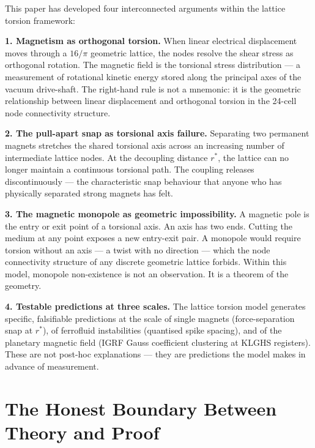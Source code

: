\documentclass[11pt, letterpaper, openany]{book}
\begin{document}
This paper has developed four interconnected arguments within the
lattice torsion framework:

\textbf{1. Magnetism as orthogonal torsion.} When linear electrical
displacement moves through a $16/\pi$ geometric lattice, the nodes
resolve the shear stress as orthogonal rotation. The magnetic field
is the torsional stress distribution — a measurement of rotational
kinetic energy stored along the principal axes of the vacuum drive-shaft.
The right-hand rule is not a mnemonic: it is the geometric relationship
between linear displacement and orthogonal torsion in the 24-cell
node connectivity structure.

\textbf{2. The pull-apart snap as torsional axis failure.} Separating
two permanent magnets stretches the shared torsional axis across an
increasing number of intermediate lattice nodes. At the decoupling
distance $r^*$, the lattice can no longer maintain a continuous
torsional path. The coupling releases discontinuously — the characteristic
snap behaviour that anyone who has physically separated strong magnets
has felt.

\textbf{3. The magnetic monopole as geometric impossibility.} A magnetic
pole is the entry or exit point of a torsional axis. An axis has two
ends. Cutting the medium at any point exposes a new entry-exit pair.
A monopole would require torsion without an axis — a twist with no
direction — which the node connectivity structure of any discrete
geometric lattice forbids. Within this model, monopole non-existence
is not an observation. It is a theorem of the geometry.

\textbf{4. Testable predictions at three scales.} The lattice torsion
model generates specific, falsifiable predictions at the scale of
single magnets (force-separation snap at $r^*$), of ferrofluid
instabilities (quantised spike spacing), and of the planetary magnetic
field (IGRF Gauss coefficient clustering at KLGHS registers). These
are not post-hoc explanations — they are predictions the model makes
in advance of measurement.

\section{The Honest Boundary Between Theory and Proof}
\end{document}

